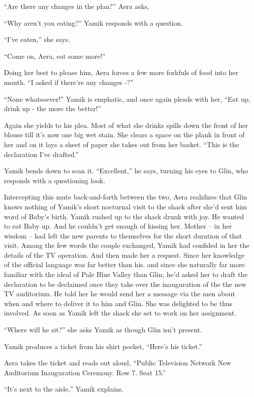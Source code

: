 \documentclass[twoside,11pt]{book}
\begin{document}
``Are there any changes in the plan?'' Aera asks,

``Why aren't you eating?'' Yamik responds with a question.

``I've eaten,'' she says.

``Come on, Aera, eat some more!''

Doing her best to please him, Aera forces a few more forkfuls of food into her mouth. ``I asked if there're
any changes -?''

``None whatsoever!'' Yamik is emphatic, and once again pleads with her, ``Eat up, drink up
- the more the better!''

Again she yields to his plea. Most of what she drinks spills down the front of her blouse till it's now one big wet
stain. She clears a space on the plank in front of her and on it lays a sheet of paper she takes out from her basket.
``This is the declaration I've drafted.''

Yamik bends down to scan it. ``Excellent,'' he says, turning his eyes to Glin, who responds
with a questioning look.

Intercepting this mute back-and-forth between the two, Aera realzlizes that Glin knows nothing of Yamik's short
nocturnal visit to the shack after she'd sent him word of Baby's birth. Yamik rushed up to the shack drunk with joy.
He wanted to eat Baby up. And he couldn't get enough of kissing her.  Mother -- in her wisdom -- had
left the new parents to themselves for the short duration of that visit. Among the few words the couple exchanged,
Yamik had confided in her the details of the TV operation. And then made her a request. Since her knowledge of the
official language was far better than his. and since she naturally far more familiar with the ideal of Pale Blue
Valley than Glin, he'd asked her to draft the declaration to be declaimed once they take over the inauguration of the
the new TV auditorium. He told her he would send her a message via the men about when and where to deliver it to him
and Glin. She was delighted to be thus involved. As soon as Yamik left the shack she set to work on her
assignment.

``Where will he sit?'' she asks Yamik as though Glin isn't present.

Yamik produces a ticket from his shirt pocket, ``Here's his ticket.''

Aera takes the ticket and reads out aloud, ``Public Television Network New Auditorium Inauguration
Ceremony. Row 7. Seat 15.''

``It's next to the aisle,'' Yamik explains.
\end{document}

